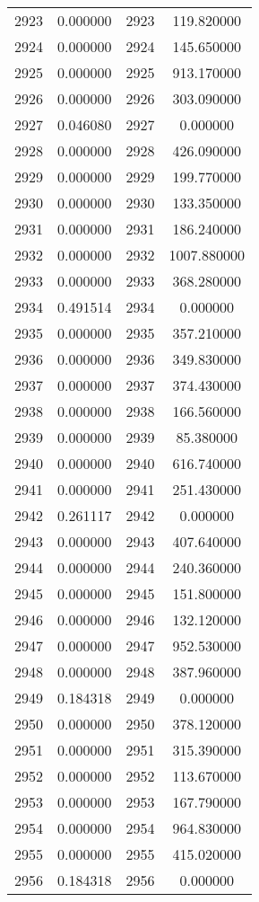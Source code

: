 \documentclass[12pt]{article}
\begin{document}
\begin{longtable}{@{}cccc@{}}
2923 & 0.000000 & 2923 & 119.820000 \\
2924 & 0.000000 & 2924 & 145.650000 \\
2925 & 0.000000 & 2925 & 913.170000 \\
2926 & 0.000000 & 2926 & 303.090000 \\
2927 & 0.046080 & 2927 & 0.000000 \\
2928 & 0.000000 & 2928 & 426.090000 \\
2929 & 0.000000 & 2929 & 199.770000 \\
2930 & 0.000000 & 2930 & 133.350000 \\
2931 & 0.000000 & 2931 & 186.240000 \\
2932 & 0.000000 & 2932 & 1007.880000 \\
2933 & 0.000000 & 2933 & 368.280000 \\
2934 & 0.491514 & 2934 & 0.000000 \\
2935 & 0.000000 & 2935 & 357.210000 \\
2936 & 0.000000 & 2936 & 349.830000 \\
2937 & 0.000000 & 2937 & 374.430000 \\
2938 & 0.000000 & 2938 & 166.560000 \\
2939 & 0.000000 & 2939 & 85.380000 \\
2940 & 0.000000 & 2940 & 616.740000 \\
2941 & 0.000000 & 2941 & 251.430000 \\
2942 & 0.261117 & 2942 & 0.000000 \\
2943 & 0.000000 & 2943 & 407.640000 \\
2944 & 0.000000 & 2944 & 240.360000 \\
2945 & 0.000000 & 2945 & 151.800000 \\
2946 & 0.000000 & 2946 & 132.120000 \\
2947 & 0.000000 & 2947 & 952.530000 \\
2948 & 0.000000 & 2948 & 387.960000 \\
2949 & 0.184318 & 2949 & 0.000000 \\
2950 & 0.000000 & 2950 & 378.120000 \\
2951 & 0.000000 & 2951 & 315.390000 \\
2952 & 0.000000 & 2952 & 113.670000 \\
2953 & 0.000000 & 2953 & 167.790000 \\
2954 & 0.000000 & 2954 & 964.830000 \\
2955 & 0.000000 & 2955 & 415.020000 \\
2956 & 0.184318 & 2956 & 0.000000 \\

\end{longtable}
\end{document}
